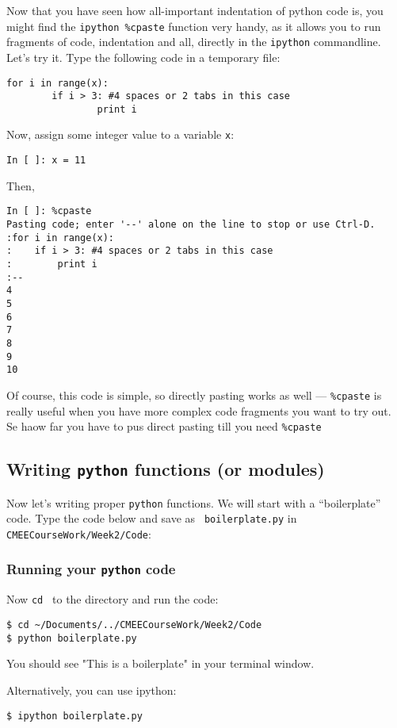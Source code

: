\begin{tipbox}
Now that you have seen how all-important indentation of python code is, 
you might find the {\tt ipython \%cpaste} function very handy, as it 
allows you to run fragments of code, indentation and all, directly in 
the {\tt ipython} commandline. Let's try it. Type the following code 
in a temporary file:
\begin{lstlisting}
for i in range(x):
		if i > 3: #4 spaces or 2 tabs in this case
				print i 
\end{lstlisting}
Now, assign some integer value to a variable {\tt x}: 
\begin{lstlisting}
In [ ]: x = 11
\end{lstlisting}
Then,
\begin{lstlisting}
In [ ]: %cpaste
Pasting code; enter '--' alone on the line to stop or use Ctrl-D.
:for i in range(x):
:    if i > 3: #4 spaces or 2 tabs in this case
:        print i
:--
4
5
6
7
8
9
10
\end{lstlisting}
Of course, this code is simple, so directly pasting works as well --- 
{\tt \%cpaste} is really useful when you have more complex code fragments 
you want to try out. Se haow far you have to pus direct pasting till 
you need {\tt \%cpaste}
\end{tipbox}

\subsection{Writing {\tt python} functions (or modules)}

Now let's writing proper {\tt python} functions. We will start with a 
``boilerplate'' code. Type the code below and save as {\tt 
boilerplate.py} in {\tt CMEECourseWork/Week2/Code}:



\subsubsection{Running your {\tt python} code}

Now {\tt cd } to the directory and run the code:
\begin{lstlisting}
$ cd ~/Documents/../CMEECourseWork/Week2/Code
$ python boilerplate.py
\end{lstlisting}

You should see "This is a boilerplate" in your terminal window. 

Alternatively, you can use ipython:
\begin{lstlisting} 
$ ipython boilerplate.py
\end{lstlisting}

